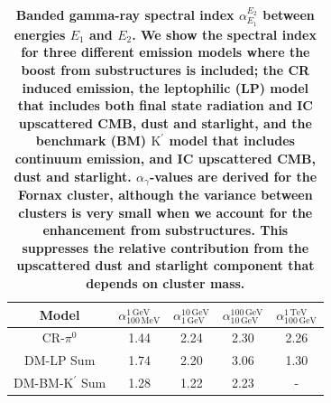 \documentclass[10pt,aps,pra,reprint,amsmath,amsfonts,amssymb,showpacs,nofootinbib,floatfix]{revtex4-1}
\def\del#1{{}}
\def\C#1{{\bf #1}}
\newcommand{\rmn}{\mathrm}
\newcommand{\Kp}{\rmn{K}^\prime}
\begin{document}
\del{ For further discussion about the impact of different
  spectral indices on the gamma-ray upper limits see
  Eq.~(\ref{sect:spectral}) and related text.}

\begin{table}
\begin{tabular}{ccccc}
\hline\hline
      Model & $\alpha_{100\,\rmn{MeV}}^{1\,\rmn{GeV}}$  & 
              $\alpha_{1\,\rmn{GeV}}^{10\,\rmn{GeV}}$   & 
              $\alpha_{10\,\rmn{GeV}}^{100\,\rmn{GeV}}$ &
              $\alpha_{100\,\rmn{GeV}}^{1\,\rmn{TeV}}$  \\
\hline
CR-$\pi^0$      & 1.44 & 2.24 & 2.30 & 2.26 \\
DM-LP Sum       & 1.74 & 2.20 & 3.06 & 1.30 \\
DM-BM-$\Kp$ Sum  & 1.28 & 1.22 & 2.23 & -    \\
\hline\hline
\end{tabular}
\caption{\C{Banded gamma-ray spectral index $\alpha_{E_1}^{E_2}$ between
    energies $E_1$ and $E_2$. We show the spectral index for three
    different emission models where the boost from substructures is
    included; the CR induced emission, the leptophilic (LP) model
    that includes both final state radiation and IC upscattered CMB,
    dust and starlight, and the benchmark (BM) $\Kp$ model that
    includes continuum emission, and IC upscattered CMB, dust and
    starlight. $\alpha_\gamma$-values are derived for the Fornax cluster,
    although the variance between clusters is very small when we account for the
    enhancement from substructures. This  suppresses the
    relative contribution from the upscattered dust and starlight
    component that depends on  cluster mass. \label{tab:spectral_index}}}
\end{table}
\end{document}
